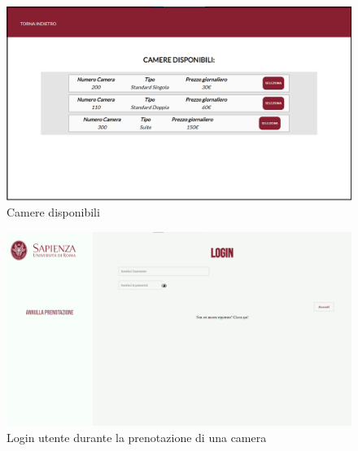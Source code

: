 \documentclass [a4paper, 12pt]{book}
\begin{document}
\begin{figure}[h]
\centering
\includegraphics[scale=0.24]{VisualizzaDisponibilita.png}
\caption{Camere disponibili}
\label{VisualizzaDisponibilita}
\end{figure}\newpage

\begin{figure}[h]
\centering
\includegraphics[scale=0.3]{LoginPrenotazione.png}
\caption{Login utente durante la prenotazione di una camera}
\label{LoginPrenotazione}
\end{figure}
\end{document}
